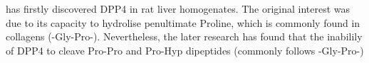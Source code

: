 \citet{Hopsu-Havu1966} has firstly discovered DPP4 in rat liver homogenates. The original interest was due to its capacity to hydrolise penultimate Proline, which is commonly found in collagens (-Gly-Pro-). Nevertheless, the later research has found that the inabilily of DPP4 to cleave Pro-Pro and Pro-Hyp dipeptides (commonly follows -Gly-Pro-)
